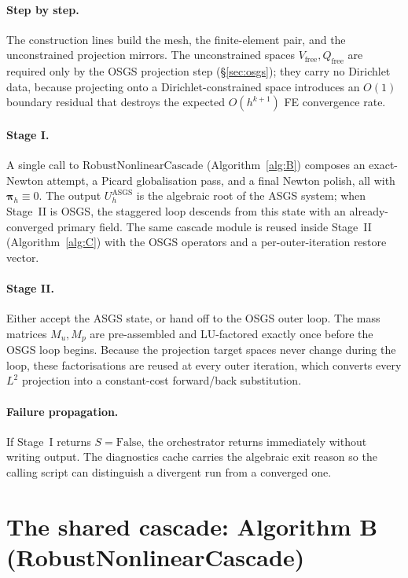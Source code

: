 \documentclass{article}
\begin{document}
\paragraph{Step by step.}  The construction lines build the mesh, the
finite-element pair, and the unconstrained projection mirrors. The
unconstrained spaces $V_{\mathrm{free}}, Q_{\mathrm{free}}$ are required
only by the OSGS projection step (§\ref{sec:osgs}); they carry no
Dirichlet data, because projecting onto a Dirichlet-constrained space
introduces an $O(1)$ boundary residual that destroys the expected
$O(h^{k+1})$ FE convergence rate.

\paragraph{Stage I.}  A single call to $\mathrm{RobustNonlinearCascade}$
(Algorithm~\ref{alg:B}) composes an exact-Newton attempt, a Picard
globalisation pass, and a final Newton polish, all with
$\boldsymbol{\pi}_h \equiv 0$. The output $U_h^{\mathrm{ASGS}}$ is the
algebraic root of the ASGS system; when Stage~II is OSGS, the
staggered loop descends from this state with an already-converged
primary field. The same cascade module is reused inside Stage~II
(Algorithm~\ref{alg:C}) with the OSGS operators and a per-outer-iteration
restore vector.

\paragraph{Stage II.}  Either accept the ASGS state, or hand off to the
OSGS outer loop. The mass matrices $M_u, M_p$ are pre-assembled and
LU-factored exactly once before the OSGS loop begins. Because the
projection target spaces never change during the loop, these
factorisations are reused at every outer iteration, which converts
every $L^2$ projection into a constant-cost forward/back substitution.

\paragraph{Failure propagation.}  If Stage~I returns $S = \mathrm{False}$,
the orchestrator returns immediately without writing output. The
diagnostics cache carries the algebraic exit reason so the calling
script can distinguish a divergent run from a converged one.

\section{The shared cascade: Algorithm B (RobustNonlinearCascade)}
\label{sec:picard}
\end{document}
